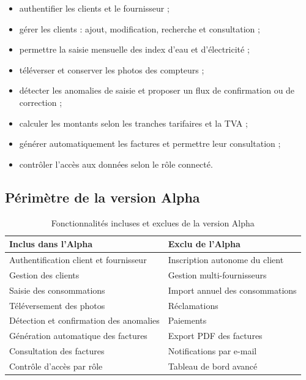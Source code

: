 \begin{itemize}[leftmargin=*]
  \item authentifier les clients et le fournisseur ;
  \item gérer les clients : ajout, modification, recherche et consultation ;
  \item permettre la saisie mensuelle des index d'eau et d'électricité ;
  \item téléverser et conserver les photos des compteurs ;
  \item détecter les anomalies de saisie et proposer un flux de confirmation ou de correction ;
  \item calculer les montants selon les tranches tarifaires et la TVA ;
  \item générer automatiquement les factures et permettre leur consultation ;
  \item contrôler l'accès aux données selon le rôle connecté.
\end{itemize}

\subsection{Périmètre de la version Alpha}

\begin{table}[H]
\centering
\caption{Fonctionnalités incluses et exclues de la version Alpha}
\label{tab:perimetre}
\begin{tabular}{p{}p{}}
\toprule
\textbf{Inclus dans l'Alpha} & \textbf{Exclu de l'Alpha} \\
\midrule
Authentification client et fournisseur & Inscription autonome du client \\
Gestion des clients & Gestion multi-fournisseurs \\
Saisie des consommations & Import annuel des consommations \\
Téléversement des photos & Réclamations \\
Détection et confirmation des anomalies & Paiements \\
Génération automatique des factures & Export PDF des factures \\
Consultation des factures & Notifications par e-mail \\
Contrôle d'accès par rôle & Tableau de bord avancé \\
\bottomrule
\end{tabular}
\end{table}

